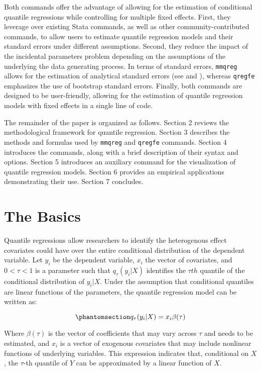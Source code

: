 \documentclass[bib]{statapress}
\begin{document}
Both commands offer the advantage of allowing for the estimation of
conditional quantile regressions while controlling for multiple fixed
effects. First, they leverage over existing Stata commands, as well as
other community-contributed commands, to allow users to estimate
quantile regression models and their standard errors under different
assumptions. Second, they reduce the impact of the incidental parameters
problem depending on the assumptions of the underlying the data
generating process. In terms of standard errors, \texttt{mmqreg} allows
for the estimation of analytical standard errors (see \citet{mss2019}
and \citet{riosavila2024}), whereas \texttt{qregfe} emphasizes the use
of bootstrap standard errors. Finally, both commands are designed to be
user-friendly, allowing for the estimation of quantile regression models
with fixed effects in a single line of code.

The remainder of the paper is organized as follows. Section 2 reviews
the methodological framework for quantile regression. Section 3
describes the methods and formulas used by \texttt{mmqreg} and
\texttt{qregfe} commands. Section 4 introduces the commands, along with
a brief description of their syntax and options. Section 5 introduces an
auxiliary command for the visualization of quantile regression models.
Section 6 provides an empirical applications demonstrating their use.
Section 7 concludes.

\section{The Basics}\label{sec-basics}

Quantile regressions allow researchers to identify the heterogenous
effect covariates could have over the entire conditional distribution of
the dependent variable. Let \(y_i\) be the dependent variable, \(x_i\)
the vector of covariates, and \(0<\tau<1\) is a parameter such that
\(q_\tau(y_i|X)\) identifies the \(\tau th\) quantile of the conditional
distribution of \(y_i|X\). Under the assumption that conditional
quantiles are linear functions of the parameters, the quantile
regression model can be written as:

\begin{equation}\phantomsection\label{eq-qr}{q_\tau(y_i|X)=x_i\beta(\tau)
}\end{equation}

Where \(\beta(\tau)\) is the vector of coefficients that may vary across
\(\tau\) and needs to be estimated, and \(x_i\) is a vector of exogenous
covariates that may include nonlinear functions of underlying variables.
This expression indicates that, conditional on \(X\), the \(\tau\)-th
quantile of \(Y\) can be approximated by a linear function of \(X\).
\end{document}
